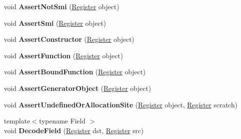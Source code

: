 \begin{DoxyCompactItemize}
void {\bfseries Assert\+Not\+Smi} (\mbox{\hyperlink{classv8_1_1internal_1_1Register}{Register}} object)
\item 
\mbox{\label{classv8_1_1internal_1_1MacroAssembler_aca8963bd0a98454d6ad0e4aa34d8cab8}} 
void {\bfseries Assert\+Smi} (\mbox{\hyperlink{classv8_1_1internal_1_1Register}{Register}} object)
\item 
\mbox{\label{classv8_1_1internal_1_1MacroAssembler_a6a0f31c1173192d0ff1e325d711e099f}} 
void {\bfseries Assert\+Constructor} (\mbox{\hyperlink{classv8_1_1internal_1_1Register}{Register}} object)
\item 
\mbox{\label{classv8_1_1internal_1_1MacroAssembler_aa8d13935f0543f10e23d7b44595f48bb}} 
void {\bfseries Assert\+Function} (\mbox{\hyperlink{classv8_1_1internal_1_1Register}{Register}} object)
\item 
\mbox{\label{classv8_1_1internal_1_1MacroAssembler_acbd0894b4e268684a580f99882497aed}} 
void {\bfseries Assert\+Bound\+Function} (\mbox{\hyperlink{classv8_1_1internal_1_1Register}{Register}} object)
\item 
\mbox{\label{classv8_1_1internal_1_1MacroAssembler_aa71ed557199e69728a422efb18e8fc65}} 
void {\bfseries Assert\+Generator\+Object} (\mbox{\hyperlink{classv8_1_1internal_1_1Register}{Register}} object)
\item 
\mbox{\label{classv8_1_1internal_1_1MacroAssembler_ac5a6e24ffce5d432cf0bf668b8460ff5}} 
void {\bfseries Assert\+Undefined\+Or\+Allocation\+Site} (\mbox{\hyperlink{classv8_1_1internal_1_1Register}{Register}} object, \mbox{\hyperlink{classv8_1_1internal_1_1Register}{Register}} scratch)
\item 
\mbox{\label{classv8_1_1internal_1_1MacroAssembler_a255a40c7f619cdf00e2b66de3afaf6f1}} 
{\footnotesize template$<$typename Field $>$ }\\void {\bfseries Decode\+Field} (\mbox{\hyperlink{classv8_1_1internal_1_1Register}{Register}} dst, \mbox{\hyperlink{classv8_1_1internal_1_1Register}{Register}} src)

\end{DoxyCompactItemize}
